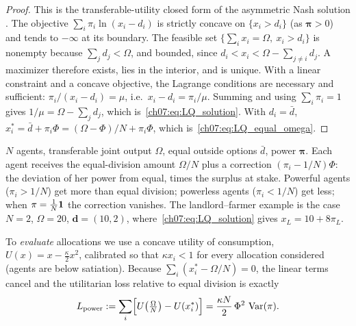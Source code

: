 \documentclass[../structural_economics_book.tex]{subfiles}
\begin{document}
\begin{proof}
This is the transferable-utility closed form of the asymmetric Nash solution \citep{kalai1977nonsymmetric}. The objective $\sum_i \pi_i \ln(x_i - d_i)$ is strictly concave on $\{x_i > d_i\}$ (as $\boldsymbol{\pi} > 0$) and tends to $-\infty$ at its boundary. The feasible set $\{\sum_i x_i = \Omega,\ x_i > d_i\}$ is nonempty because $\sum_j d_j < \Omega$, and bounded, since $d_i < x_i < \Omega - \sum_{j \neq i} d_j$. A maximizer therefore exists, lies in the interior, and is unique. With a linear constraint and a concave objective, the Lagrange conditions are necessary and sufficient: $\pi_i/(x_i - d_i) = \mu$, i.e.\ $x_i - d_i = \pi_i/\mu$. Summing and using $\sum_i \pi_i = 1$ gives $1/\mu = \Omega - \sum_j d_j$, which is~\eqref{ch07:eq:LQ_solution}. With $d_i = \bar{d}$, $x_i^* = \bar{d} + \pi_i\Phi = (\Omega - \Phi)/N + \pi_i\Phi$, which is~\eqref{ch07:eq:LQ_equal_omega}.
\end{proof}

\begin{example}\label{ch07:ex:LQ_bargaining}
$N$ agents, transferable joint output $\Omega$, equal outside options $\bar{d}$, power $\boldsymbol{\pi}$. Each agent receives the equal-division amount $\Omega/N$ plus a correction $(\pi_i - 1/N)\Phi$: the deviation of her power from equal, times the surplus at stake. Powerful agents ($\pi_i > 1/N$) get more than equal division; powerless agents ($\pi_i < 1/N$) get less; when $\pi = \frac{1}{N}\mathbf{1}$ the correction vanishes. The landlord--farmer example is the case $N = 2$, $\Omega = 20$, $\boldsymbol{d} = (10, 2)$, where~\eqref{ch07:eq:LQ_solution} gives $x_L = 10 + 8\pi_L$.

To \textit{evaluate} allocations we use a concave utility of consumption, $U(x) = x - \frac{\kappa}{2}x^2$, calibrated so that $\kappa x_i < 1$ for every allocation considered (agents are below satiation). Because $\sum_i (x_i^* - \Omega/N) = 0$, the linear terms cancel and the utilitarian loss relative to equal division is exactly
\begin{equation}\label{ch07:eq:Lpower}
L_{\text{power}} := \sum_{i} \Bigl[U\bigl(\tfrac{\Omega}{N}\bigr) - U(x_i^*)\Bigr] = \frac{\kappa N}{2}\,\Phi^2\,\operatorname{Var}(\pi).
\end{equation}
\end{example}
\end{document}
